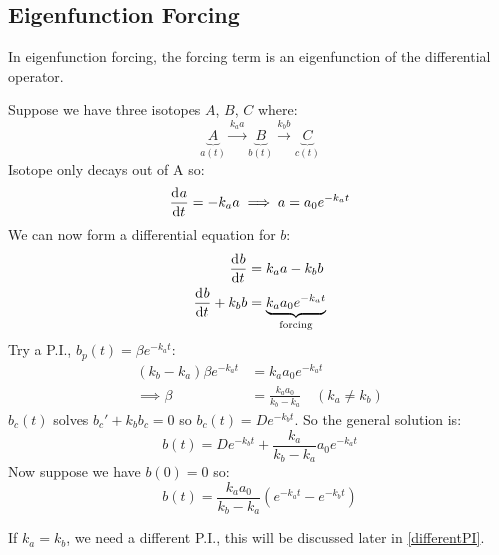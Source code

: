 \documentclass[../main.tex]{subfiles}
\begin{document}
\subsection{Eigenfunction Forcing}
In eigenfunction forcing, the forcing term is an eigenfunction of the differential operator.
\begin{example}
  Suppose we have three isotopes $A$, $B$, $C$ where:
  \[
    \underbrace{A}_{a(t)} \xrightarrow{k_a a} \underbrace{B}_{b(t)} \xrightarrow{k_b b} \underbrace{C}_{c(t)}
  \]
  Isotope only decays out of A so:
  \[
    \deriv{a}{t} = -k_a a \implies a = a_0 e^{-k_a t}
  \]
  We can now form a differential equation for $b$:
  \begin{align*}
    \deriv{b}{t} &= k_a a -k_b b \\
    \deriv{b}{t} + k_b b &= \underbrace{k_a a_0 e^{-k_a t}}_{\text{forcing}} \\
    \label{radioactive}
  \end{align*}
  Try a P.I., $b_p(t) = \beta e^{-k_a t}$:
  \begin{align*}
    (k_b - k_a)\beta e^{-k_a t} &= k_a a_0e^{-k_a t} \\
    \implies \beta &= \frac{k_a a_0}{k_b - k_a}\quad(k_a \neq k_b)
  \end{align*}
  $b_c(t)$ solves $b_c' + k_b b_c = 0$ so $b_c(t) = De^{-k_b t}$.
  So the general solution is:
  \[
    b(t) = De^{-k_b t} + \frac{k_a}{k_b - k_a}a_0 e^{-k_a t}
  \]
  Now suppose we have $b(0) = 0$ so:
  \[
    b(t) = \frac{k_a a_0}{k_b - k_a}(e^{-k_a t} - e^{-k_b t})
  \]
  \begin{center}
  \end{center}
  If $k_a = k_b$, we need a different P.I., this will be discussed later in \cref{differentPI}.
\end{example}
\end{document}
